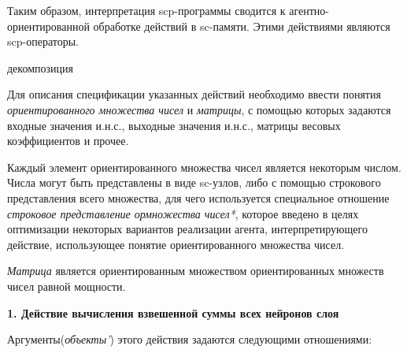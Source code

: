 Таким образом, интерпретация scp-программы сводится к агентно-ориентированной обработке действий в sc-памяти. Этими действиями являются scp-операторы.

\begin{SCn}
	\begin{scnrelfromset}{декомпозиция}
	\end{scnrelfromset}
\end{SCn}

Для описания спецификации указанных действий необходимо ввести понятия \textit{ориентированного множества чисел} и \textit{матрицы}, с помощью которых задаются входные значения и.н.с., выходные значения и.н.с., матрицы весовых коэффициентов и прочее.

Каждый элемент ориентированного множества чисел является некоторым числом. Числа могут быть представлены в виде sc-узлов, либо с помощью строкового представления всего множества, для чего используется специальное отношение \textit{строковое представление ормножества чисел*}, которое введено в целях оптимизации некоторых вариантов реализации агента, интерпретирующего действие, использующее понятие ориентированного множества чисел.

\begin{SCn}
\end{SCn}

\textit{Матрица} является ориентированным множеством ориентированных множеств чисел равной мощности.


\textbf{1. Действие вычисления взвешенной суммы всех нейронов слоя}

Аргументы(\textit{объекты'}) этого действия задаются следующими отношениями:
\begin{SCn}
\end{SCn}

\begin{SCn}
\end{SCn}

